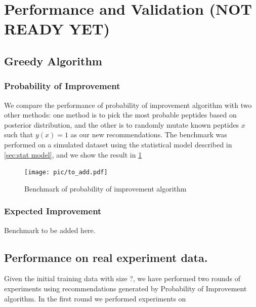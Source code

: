 \documentclass[opre,nonblindrev]{informs3} %
\begin{document}
\section{Performance and Validation (NOT READY YET)}

\subsection{Greedy Algorithm}
\subsubsection{Probability of Improvement}
We compare the performance of probability of improvement algorithm with two other methods: one method is to pick the most probable peptides based on posterior distribution, and the other is to randomly mutate known peptides $x$ such that $y(x)=1$ as our new recommendations. The benchmark was performed on a simulated dataset using the statistical model described in \ref{sec:stat model}, and we show the result in \ref{fig:PI}

\begin{figure}[hpt] 
\center
\texttt{[image: pic/to\_add.pdf]}
\caption{Benchmark of probability of improvement algorithm}
\label{fig:PI}
\end{figure}

\subsubsection{Expected Improvement}
Benchmark to be added here.

\subsection{Performance on real experiment data.}
Given the initial training data with size ?, we have performed two rounds of experiments using recommendations generated by Probability of Improvement algorithm. In the first round we performed experiments on 
\end{document}
